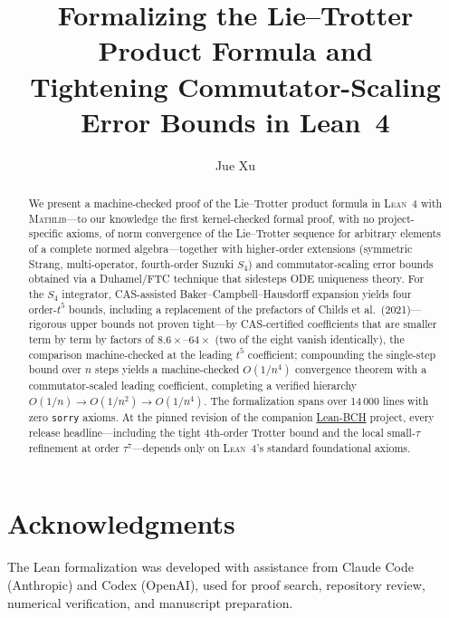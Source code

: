 \documentclass[11pt]{article}
\title{Formalizing the Lie--Trotter Product Formula and \\
Tightening Commutator-Scaling Error Bounds in Lean~4}
\author{Jue Xu}
\newcommand{\Lean}{\textsc{Lean}~4\xspace}
\newcommand{\Mathlib}{\textsc{Mathlib}\xspace}
\theoremstyle{definition}
\theoremstyle{remark}
\begin{document}
\maketitle

\begin{abstract}
We present a machine-checked proof of the Lie--Trotter product
formula in \Lean with \Mathlib---to our knowledge the first
kernel-checked formal proof, with no project-specific axioms, of norm
convergence of the Lie--Trotter sequence for arbitrary elements of a
complete normed algebra---together with higher-order extensions
(symmetric Strang, multi-operator, fourth-order Suzuki $S_4$) and
commutator-scaling error bounds obtained via a Duhamel/FTC
technique that sidesteps ODE uniqueness theory. For the $S_4$
integrator, CAS-assisted Baker--Campbell--Hausdorff expansion yields
four order-$t^5$ bounds, including a replacement of the prefactors of
Childs et al.\ (2021)---rigorous upper bounds not proven tight---by
CAS-certified coefficients that are smaller term by term by factors of
$8.6\times$--$64\times$ (two of the eight vanish identically), the
comparison machine-checked at the leading $t^5$ coefficient; compounding the
single-step bound over $n$ steps yields a machine-checked $O(1/n^4)$
convergence theorem with a commutator-scaled leading coefficient,
completing a verified hierarchy $O(1/n) \to O(1/n^2) \to O(1/n^4)$.
The formalization spans over 14\,000 lines with zero \texttt{sorry}
axioms. At the pinned revision of the companion
\href{https://github.com/Jue-Xu/Lean-BCH}{Lean-BCH} project, every
release headline---including the tight 4th-order Trotter bound and the
local small-$\tau$ refinement at order $\tau^7$---depends only on
\Lean's standard foundational axioms.
\end{abstract}

\tableofcontents
\bigskip









\appendix


\section*{Acknowledgments}
The Lean formalization was developed with assistance from Claude Code
(Anthropic) and Codex (OpenAI), used for proof search, repository review,
numerical verification, and manuscript preparation.



\end{document}

